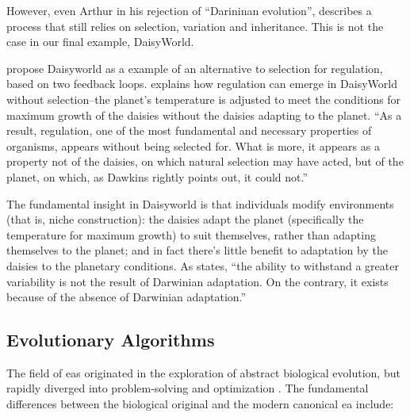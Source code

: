 However, even Arthur in his rejection of ``Darininan evolution'', describes a process that still relies on selection, variation and inheritance. This is not the case in our final example, DaisyWorld.

\Cite{LovelockMargulis2011} propose Daisyworld as a example of an alternative to selection for regulation, based on two feedback loops. \cite{Saunders1994} explains how regulation can emerge in DaisyWorld without selection--the planet's temperature is adjusted to meet the conditions for maximum growth of the daisies without the daisies adapting to the planet. ``As a result, regulation, one of the most fundamental and necessary properties of organisms, appears without being selected for. What is more, it appears as a property not of the daisies, on which natural selection may have acted, but of the planet, on which, as Dawkins rightly points out, it could not.'' \parencite{Saunders1994}

The fundamental insight in Daisyworld is that individuals modify environments (that is, niche construction): the daisies adapt the planet (specifically the temperature for maximum growth) to suit themselves, rather than adapting themselves to the planet; and in fact there's little benefit to adaptation by the daisies to the planetary conditions. As \cite{Saunders1994} states, ``the ability to withstand a greater variability is not the result of Darwinian adaptation. On the contrary, it exists because of the absence of Darwinian adaptation.''

\subsection{Evolutionary Algorithms}

The field of \glspl{ea} originated in the exploration of abstract biological evolution, but rapidly diverged into problem-solving and optimization \cite{De-Jong:1993gy,DeJong2006}. The fundamental differences between the biological original and the modern canonical \gls{ea} include:

